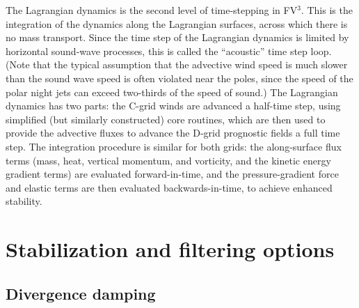 \documentclass[12pt,letterpaper]{book}
\newcommand{\fv}{FV$^{\mathrm{3}}$}
\begin{document}
The Lagrangian dynamics is the second level of time-stepping in \fv. This is the integration of the dynamics along the Lagrangian surfaces, across which there is no mass transport. Since the time step of the Lagrangian dynamics is limited by horizontal sound-wave processes, this is called the ``acoustic'' time step loop. (Note that the typical assumption that the advective wind speed is much slower than the sound wave speed is often violated near the poles, since the speed of the polar night jets can exceed two-thirds of the speed of sound.) The Lagrangian dynamics has two parts: the C-grid winds are advanced a half-time step, using simplified (but similarly constructed) core routines, which are then used to provide the advective fluxes to advance the D-grid prognostic fields a full time step. The integration procedure is similar for both grids: the along-surface flux terms (mass, heat, vertical momentum, and vorticity, and the kinetic energy gradient terms) are evaluated forward-in-time, and the pressure-gradient force and elastic terms are then evaluated backwards-in-time, to achieve enhanced stability. 


\chapter{Stabilization and filtering options} \label{chap:diffusion}

\section{Divergence damping}
\end{document}

